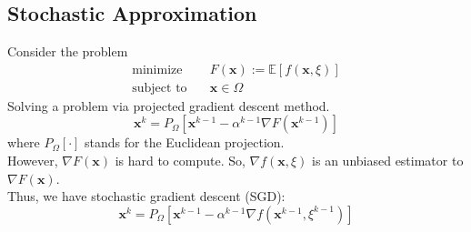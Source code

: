 \subsection{Stochastic Approximation}
Consider the problem
\begin{align}
  \text{minimize} & \quad F(\textbf{x}) := \mathbb{E}[f(\textbf{x},\xi)] \\
  \text{subject to} & \quad  \textbf{x} \in \Omega
\end{align}
Solving a problem via projected gradient descent method.
\begin{equation}
  \textbf{x}^k = P_\Omega [\textbf{x}^{k-1}- \alpha^{k-1} \nabla F(\textbf{x}^{k-1})]
\end{equation}
where $P_\Omega[\cdot ]$ stands for the Euclidean projection. \\
However, $\nabla F(\textbf{x})$ is hard to compute. So, $\nabla f(\textbf{x},\xi)$ is an unbiased estimator to $\nabla F(\textbf{x})$. \\
Thus, we have stochastic gradient descent (SGD):
\begin{equation}
  \textbf{x}^k = P_\Omega [\textbf{x}^{k-1}- \alpha^{k-1} \nabla f(\textbf{x}^{k-1},\xi^{k-1})]
\end{equation}